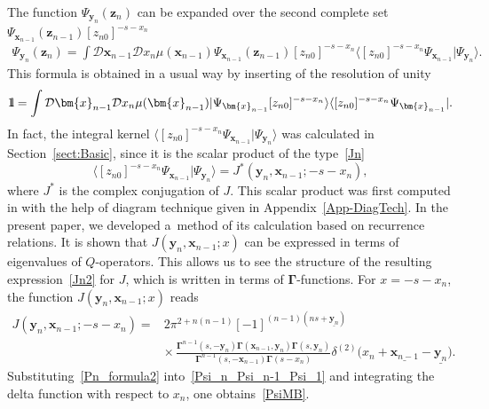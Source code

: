 \documentclass[10pt,a4paper]{amsart}
\newcommand{\II}{\hbox{{1}\kern-.25em\hbox{l}}}
\numberwithin{equation}{section}
\begin{document}
The function $\Psi_{\bm{y}_n}(\bm{z}_n)$ can be expanded over the second complete set $\Psi_{\bm{x}_{n-1}}(\bm{z}_{n-1}) [z_{n0}]^{-s-x_n}$
\begin{align} \label{Psi_n_Psi_n-1_Psi_1}
\Psi_{\bm{y}_n}(\bm{z}_n) =
\int \mathcal{D}\bm{x}_{n-1} \mathcal{D} x_n \mu(\bm{x}_{n-1})
\Psi_{\bm{x}_{n-1}}(\bm{z}_{n-1}) [z_{n0}]^{-s-x_n} \langle[z_{n0}]^{-s-x_n} \Psi_{\bm{x}_{n-1}}|\Psi_{\bm{y}_n}\rangle .
\end{align}
This formula is obtained in a usual way by inserting of the resolution of unity
\begin{align*}
\II = \int \mathcal{D}\bm{x}_{n-1} \mathcal{D} x_n \mu(\bm{x}_{n-1})
|\Psi_{\bm{x}_{n-1}} [z_{n0}]^{-s-x_n}\rangle \langle[z_{n0}]^{-s-x_n} \Psi_{\bm{x}_{n-1}}| .
\end{align*}
In fact, the integral kernel $\langle[z_{n0}]^{-s-x_n} \Psi_{\bm{x}_{n-1}}|\Psi_{\bm{y}_n}\rangle$ was calculated in Section~\ref{sect:Basic}, since it is the scalar product of the type~\eqref{Jn}
\begin{equation*}
	\langle[z_{n0}]^{-s-x_n} \Psi_{\bm{x}_{n-1}}|\Psi_{\bm{y}_n}\rangle = J^\ast(\bm{y}_n,\bm{x}_{n-1}; -s-x_n) ,
\end{equation*}
where $J^\ast$ is the complex conjugation of $J$. This scalar product was first computed in \cite{Val20} with the help of diagram technique given in Appendix~\ref{App-DiagTech}. In the present paper, we developed a~method of its calculation based on recurrence relations. It is shown that $J(\bm{y}_n,\bm{x}_{n-1}; x)$ can be expressed in terms of eigenvalues of $Q$-operators. This allows us to see the structure of the resulting expression~\eqref{Jn2} for $J$, which is written in terms of $\mathbf{\Gamma}$-functions.
For $x=-s-x_n$, the function $J(\bm{y}_n,\bm{x}_{n-1}; x)$ reads
\begin{align}
\nonumber
J(\bm{y}_n,\bm{x}_{n-1}; -s-x_n) ={}&
2\pi^{2+n(n-1)}[-1]^{(n-1)(ns+\underline{\bm{y}_n})} \\
& \label{Pn_formula2}
{\times}\,
\frac{\mathbf{\Gamma}^{n-1}(s ,-\bm{y}_n)
\mathbf{\Gamma}(\bm{x}_{n-1},\bm{y}_n)
\mathbf{\Gamma}(s ,\bm{y}_n)}
{\mathbf{\Gamma}^{n-1}(s ,-\bm{x}_{n-1}) \mathbf{\Gamma}(s-x_n)}
\delta^{(2)}\bigl(x_n+\underline{\bm{x}_{n-1}}-\underline{\bm{y}_n}\bigr) .
\end{align}
Substituting~\eqref{Pn_formula2} into~\eqref{Psi_n_Psi_n-1_Psi_1} and integrating the delta function with respect to $x_n$, one obtains~\eqref{PsiMB}.
\end{document}
